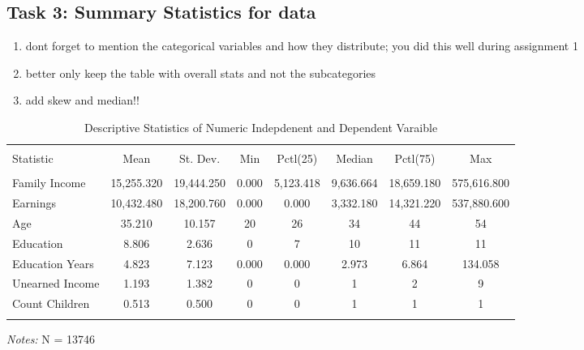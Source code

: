 \documentclass[a4paper]{article}
\begin{document}
\subsection{Task 3: Summary Statistics for data}


\begin{enumerate}
   \item  dont forget to mention the categorical variables and how they distribute; you did this well during assignment 1
   \item better only keep the table with overall stats and not the subcategories 
   \item add skew and median!!
\end{enumerate}

\begin{table}[!htbp] 
\begin{adjustwidth}{-0cm}{-0cm}
\begin{threeparttable}
\small
\captionsetup{font=small, justification=raggedright,singlelinecheck=false}
  \caption{Descriptive Statistics of Numeric Indepdenent and Dependent Varaible} 
  \label{} 
\begin{tabular}{@{\extracolsep{5pt}}lccccccc} 
\\[-1.8ex]\hline 
\hline \\[-1.8ex] 
Statistic & \multicolumn{1}{c}{Mean} & \multicolumn{1}{c}{St. Dev.} & \multicolumn{1}{c}{Min} & \multicolumn{1}{c}{Pctl(25)} & \multicolumn{1}{c}{Median} & \multicolumn{1}{c}{Pctl(75)} & \multicolumn{1}{c}{Max} \\ 
\hline \\[-1.8ex] 
Family Income & 15,255.320 & 19,444.250 & 0.000 & 5,123.418 & 9,636.664 & 18,659.180 & 575,616.800 \\ 
Earnings & 10,432.480 & 18,200.760 & 0.000 & 0.000 & 3,332.180 & 14,321.220 & 537,880.600 \\ 
Age & 35.210 & 10.157 & 20 & 26 & 34 & 44 & 54 \\ 
Education & 8.806 & 2.636 & 0 & 7 & 10 & 11 & 11 \\ 
Education Years & 4.823 & 7.123 & 0.000 & 0.000 & 2.973 & 6.864 & 134.058 \\ 
Unearned Income & 1.193 & 1.382 & 0 & 0 & 1 & 2 & 9 \\ 
Count Children & 0.513 & 0.500 & 0 & 0 & 1 & 1 & 1 \\ 
\hline \\[-1.8ex] 
\end{tabular} 
\begin{tablenotes}
      \small
      \item\textit{Notes:} N = 13746
    \end{tablenotes}
\end{threeparttable}
\end{adjustwidth}
\end{table}
\end{document}
